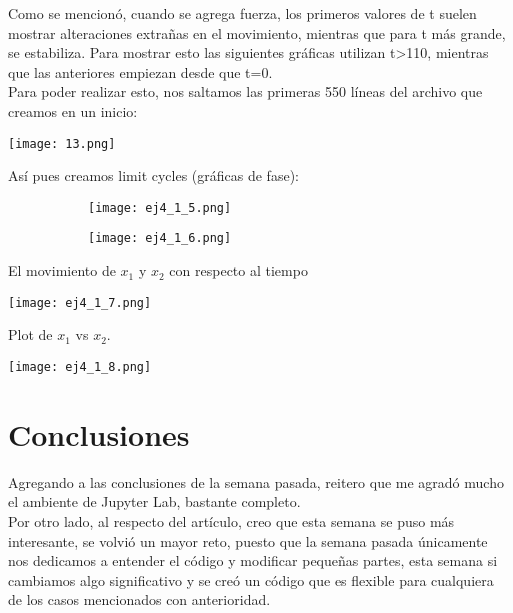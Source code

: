 \documentclass[12pt]{article}
\begin{document}
\begin{itemize}
\begin{itemize}
Como se mencionó, cuando se agrega fuerza, los primeros valores de t suelen mostrar alteraciones extrañas en el movimiento, mientras que para t más grande, se estabiliza. Para mostrar esto las siguientes gráficas utilizan t>110, mientras que las anteriores empiezan desde que t=0. \\

Para poder realizar esto, nos saltamos las primeras 550 líneas del archivo que creamos en un inicio:

\begin{center}
        \texttt{[image: 13.png]}
\end{center}

Así pues creamos limit cycles (gráficas de fase):

\begin{figure}[h!]
\begin{subfigure}{.55\textwidth}
\centering
\texttt{[image: ej4\_1\_5.png]}
\end{subfigure}
\begin{subfigure}{.55\textwidth}
\centering
\texttt{[image: ej4\_1\_6.png]}
\end{subfigure}
\end{figure}

El movimiento de $x_1$ y $x_2$ con respecto al tiempo

\begin{center}
        \texttt{[image: ej4\_1\_7.png]}
\end{center}

\cleardoublepage
Plot de $x_1$ vs $x_2$.

\begin{center}
        \texttt{[image: ej4\_1\_8.png]}
\end{center}

\end{itemize}
\end{itemize}


\section{Conclusiones}

Agregando a las conclusiones de la semana pasada, reitero que me agradó mucho el ambiente de Jupyter Lab, bastante completo. \\ 

Por otro lado, al respecto del artículo, creo que esta semana se puso más interesante, se volvió un mayor reto, puesto que la semana pasada únicamente nos dedicamos a entender el código y modificar pequeñas partes, esta semana si cambiamos algo significativo y se creó un código que es flexible para cualquiera de los casos mencionados con anterioridad. \\
\end{document}
